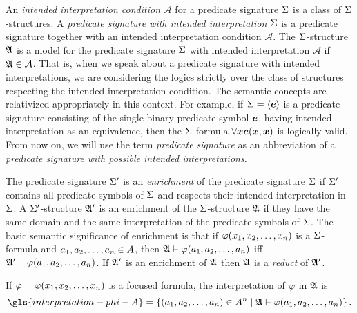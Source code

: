 An \emph{intended interpretation condition} $\mathcal{A}$ for a predicate
signature $\mathrm{\Sigma}$ is a class of $\mathrm{\Sigma}$-structures.
A \emph{predicate signature with intended interpretation}
$\mathrm{\Sigma}$ is a predicate signature together with an intended interpretation
condition $\mathcal{A}$.
The $\mathrm{\Sigma}$-structure $\mathfrak{A}$ is a model for the predicate signature $\mathrm{\Sigma}$
with intended interpretation $\mathcal{A}$ if $\mathfrak{A}\in\mathcal{A}$.
That is, when we speak about a predicate signature with intended
interpretations, we are considering the logics strictly over the class of
structures respecting the intended interpretation condition.
The semantic concepts are relativized appropriately in this context.
For example, if $\mathrm{\Sigma} = \left\langle \bm{e} \right\rangle$ is a
predicate signature consisting of the single binary predicate symbol $\bm{e}$,
having intended interpretation as an equivalence, then the $\mathrm{\Sigma}$-formula
$\forall\bm{x} \bm{e}(\bm{x},\bm{x})$ is logically valid.
From now on, we will use the term \emph{predicate signature} as an abbreviation
of a \emph{predicate signature with possible intended interpretations}.

The predicate signature $\mathrm{\Sigma'}$ is an \emph{enrichment} of the predicate
signature $\mathrm{\Sigma}$ if $\mathrm{\Sigma'}$ contains all predicate symbols of $\mathrm{\Sigma}$ and
respects their intended interpretation in $\mathrm{\Sigma}$. A $\mathrm{\Sigma'}$-structure $\mathfrak{A'}$
is an enrichment of the $\mathrm{\Sigma}$-structure $\mathfrak{A}$ if they have the same domain
and the same interpretation of the predicate symbols of $\mathrm{\Sigma}$.
The basic semantic significance of enrichment is that if
$\varphi(x_{1}, x_{2}, \dots, x_{n})$ is a $\mathrm{\Sigma}$-formula and $a_{1}, a_{2},
\dots, a_{n} \in A$, then $\mathfrak{A} \vDash \varphi(a_{1}, a_{2}, \dots, a_{n})$
iff $\mathfrak{A'} \vDash \varphi(a_{1}, a_{2}, \dots, a_{n})$.
If $\mathfrak{A'}$ is an enrichment of $\mathfrak{A}$ then $\mathfrak{A}$ is a
\emph{reduct}
of $\mathfrak{A'}$.

If $\varphi=\varphi(x_{1}, x_{2}, \dots, x_{n})$ is a focused formula, the
interpretation of $\varphi$ in $\mathfrak{A}$ is
\[
  \gls{interpretation-phi-A} = \setbd{(\eaa1, \eaa2, \dots, \eaa\nn) \in
  \domA^\nn}{\StrA \vDash \fphi(\eaa1, \eaa2, \dots, \eaa\nn)}.
\]